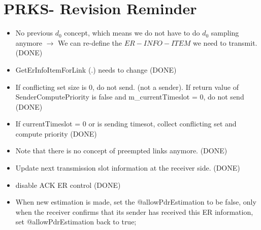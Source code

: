 \section {PRKS- Revision Reminder}
\begin{itemize}
  \item No previous $d_0$ concept, which means we do not have to do $d_0$ sampling anymore $\rightarrow$ We can re-define the $ER-INFO-ITEM$ we need to transmit.(DONE)
  \item GetErInfoItemForLink (.) needs to change (DONE)
  \item If conflicting set size is 0, do not send. (not a sender). If return value of SenderComputePriority is false and m\_currentTimeslot = 0, do not send (DONE)
  \item If currentTimeslot = 0 or is sending timesot, collect conflicting set and compute priority (DONE)
  \item Note that there is no concept of preempted links anymore. (DONE)
  \item Update next transmission slot information at the receiver side. (DONE)
  \item disable ACK ER control (DONE)
  \item When new estimation is made, set the @allowPdrEstimation to be false, only when the receiver confirms that its sender has received this ER information, set @allowPdrEstimation back to true;
\end{itemize}
